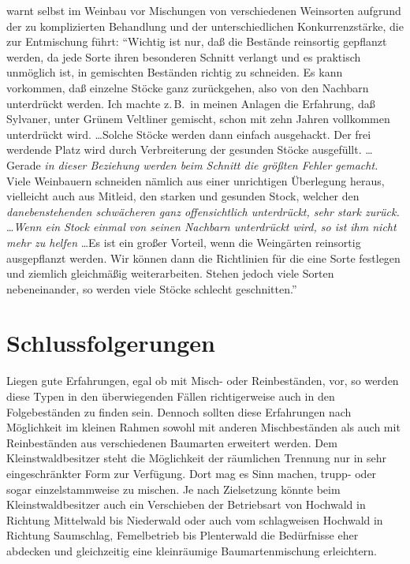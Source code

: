 \documentclass[twocolumn, paper=a4, fontsize=10pt, bibliography=totoc, index=totoc]{scrartcl}
\begin{document}
\citet[S.~126, 146 u.~152]{moser1966Weinbau} warnt selbst im Weinbau vor Mischungen von verschiedenen Weinsorten aufgrund der zu komplizierten Behandlung und der unterschiedlichen Konkurrenzstärke, die zur Entmischung führt: \enquote{Wichtig ist nur, daß die Bestände reinsortig gepflanzt werden, da jede Sorte ihren besonderen Schnitt verlangt und es praktisch unmöglich ist, in gemischten Beständen richtig zu schneiden. Es kann vorkommen, daß einzelne Stöcke ganz zurückgehen, also von den Nachbarn unterdrückt werden. Ich machte z.\,B.\ in meinen Anlagen die Erfahrung, daß Sylvaner, unter Grünem Veltliner gemischt, schon mit zehn Jahren vollkommen unterdrückt wird. \dots\@ Solche Stöcke werden dann einfach ausgehackt. Der frei werdende Platz wird durch Verbreiterung der gesunden Stöcke ausgefüllt. \dots\@ Gerade \emph{in dieser Beziehung werden beim Schnitt die größten Fehler gemacht.} Viele Weinbauern schneiden nämlich aus einer unrichtigen Überlegung heraus, vielleicht auch aus Mitleid, den starken und gesunden Stock, welcher den \emph{danebenstehenden schwächeren ganz offensichtlich unterdrückt, sehr stark zurück.} \dots\@ \emph{Wenn ein Stock einmal von seinen Nachbarn unterdrückt wird, so ist ihm nicht mehr zu helfen} \dots\@ Es ist ein großer Vorteil, wenn die Weingärten reinsortig ausgepflanzt werden. Wir können dann die Richtlinien für die eine Sorte festlegen und ziemlich gleichmäßig weiterarbeiten. Stehen jedoch viele Sorten nebeneinander, so werden viele Stöcke schlecht geschnitten.}

\section{Schlussfolgerungen}
\label{sec:schlussfolgerungen}

Liegen gute Erfahrungen, egal ob mit Misch- oder Reinbeständen, vor, so werden
diese Typen in den überwiegenden Fällen richtigerweise auch in den
Folgebeständen zu finden sein. Dennoch sollten diese Erfahrungen nach Möglichkeit
im kleinen Rahmen sowohl mit anderen Mischbeständen als auch mit Reinbeständen
aus verschiedenen Baumarten erweitert werden. Dem Kleinstwaldbesitzer steht die Möglichkeit der räumlichen Trennung nur in sehr eingeschränkter Form zur Verfügung. Dort mag es Sinn machen, trupp- oder sogar einzelstammweise zu mischen. Je nach Zielsetzung könnte beim Kleinstwaldbesitzer auch ein Verschieben der Betriebsart von Hochwald in Richtung Mittelwald bis Niederwald oder auch vom schlagweisen Hochwald in Richtung Saumschlag, Femelbetrieb bis Plenterwald die Bedürfnisse eher abdecken und gleichzeitig eine kleinräumige Baumartenmischung erleichtern.
\end{document}
